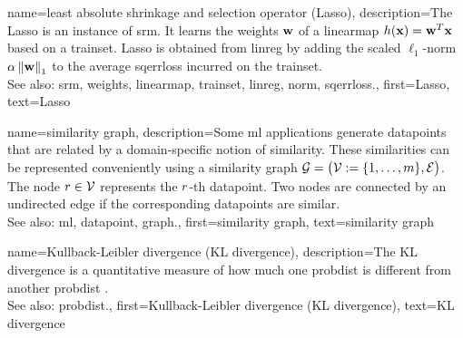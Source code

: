 
 {name={least absolute shrinkage and selection operator (Lasso)}, 
	description={The Lasso is an 
		instance of \gls{srm}. It learns the \gls{weights} ${\bf w}$ of a \gls{linearmap} 
		$h({\bf x}) = {\bf w}^{T} {\bf x}$ based on a \gls{trainset}. 
		Lasso is obtained from \gls{linreg} by adding the scaled $\ell_{1}$-\gls{norm} 
		$\alpha \left\Vert {{\bf w}} \right\Vert_{1}$ to the average \gls{sqerrloss} incurred on the \gls{trainset}. 
				\\
		See also: \gls{srm}, \gls{weights}, \gls{linearmap}, \gls{trainset}, \gls{linreg}, \gls{norm}, \gls{sqerrloss}.},
	first={Lasso},
	text={Lasso} 
}
 
 {name={similarity graph}, 
 	description={Some \gls{ml} applications generate \glspl{datapoint} that 
 		are related by a domain-specific notion of similarity. These similarities can be 
 		represented conveniently using a similarity \gls{graph} $\mathcal{G} = \big(\mathcal{V} := \{1, \ldots, m\}, \mathcal{E}\big)$. 
 		The node $r \in \mathcal{V}$ represents the $r$-th \gls{datapoint}. Two 
 		nodes are connected by an undirected edge if the corresponding \glspl{datapoint} are similar. 
				\\
		See also: \gls{ml}, \gls{datapoint}, \gls{graph}.},
 	first={similarity graph},
	text={similarity graph} 
}
 
 
 {name={Kullback-Leibler divergence (KL divergence)}, 
 	description={The KL divergence is a quantitative 
 		 measure of how much one \gls{probdist} is different from another \gls{probdist} \cite{coverthomas}.  
		 		\\
		See also: \gls{probdist}.},
 	first={Kullback-Leibler divergence (KL divergence)},
	text={KL divergence} 
}

